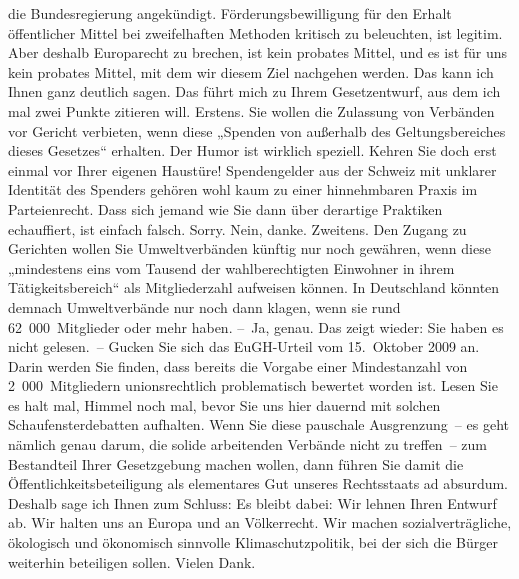 \documentclass{article}
\begin{document}
die Bundesregierung angekündigt.  Förderungsbewilligung für den Erhalt öffentlicher Mittel bei zweifelhaften Methoden kritisch zu beleuchten, ist legitim. Aber deshalb Europarecht zu brechen, ist kein probates Mittel, und es ist für uns kein probates Mittel, mit dem wir diesem Ziel nachgehen werden. Das kann ich Ihnen ganz deutlich sagen.  Das führt mich zu Ihrem Gesetzentwurf, aus dem ich mal zwei Punkte zitieren will. Erstens. Sie wollen die Zulassung von Verbänden vor Gericht verbieten, wenn diese „Spenden von außerhalb des Geltungsbereiches dieses Gesetzes“ erhalten.  Der Humor ist wirklich speziell. Kehren Sie doch erst einmal vor Ihrer eigenen Haustüre!  Spendengelder aus der Schweiz mit unklarer Identität des Spenders gehören wohl kaum zu einer hinnehmbaren Praxis im Parteienrecht.  Dass sich jemand wie Sie dann über derartige Praktiken echauffiert, ist einfach falsch. Sorry.  Nein, danke.  Zweitens. Den Zugang zu Gerichten wollen Sie Umweltverbänden künftig nur noch gewähren, wenn diese „mindestens eins vom Tausend der wahlberechtigten Einwohner in ihrem Tätigkeitsbereich“ als Mitgliederzahl aufweisen können. In Deutschland könnten demnach Umweltverbände nur noch dann klagen, wenn sie rund 62 000 Mitglieder oder mehr haben.  – Ja, genau. Das zeigt wieder: Sie haben es nicht gelesen. – Gucken Sie sich das EuGH-Urteil vom 15. Oktober 2009 an. Darin werden Sie finden, dass bereits die Vorgabe einer Mindestanzahl von 2 000 Mitgliedern unionsrechtlich problematisch bewertet worden ist. Lesen Sie es halt mal, Himmel noch mal, bevor Sie uns hier dauernd mit solchen Schaufensterdebatten aufhalten.  Wenn Sie diese pauschale Ausgrenzung – es geht nämlich genau darum, die solide arbeitenden Verbände nicht zu treffen – zum Bestandteil Ihrer Gesetzgebung machen wollen, dann führen Sie damit die Öffentlichkeitsbeteiligung als elementares Gut unseres Rechtsstaats ad absurdum. Deshalb sage ich Ihnen zum Schluss: Es bleibt dabei: Wir lehnen Ihren Entwurf ab. Wir halten uns an Europa und an Völkerrecht.  Wir machen sozialverträgliche, ökologisch und ökonomisch sinnvolle Klimaschutzpolitik, bei der sich die Bürger weiterhin beteiligen sollen.  Vielen Dank. 
\end{document}
